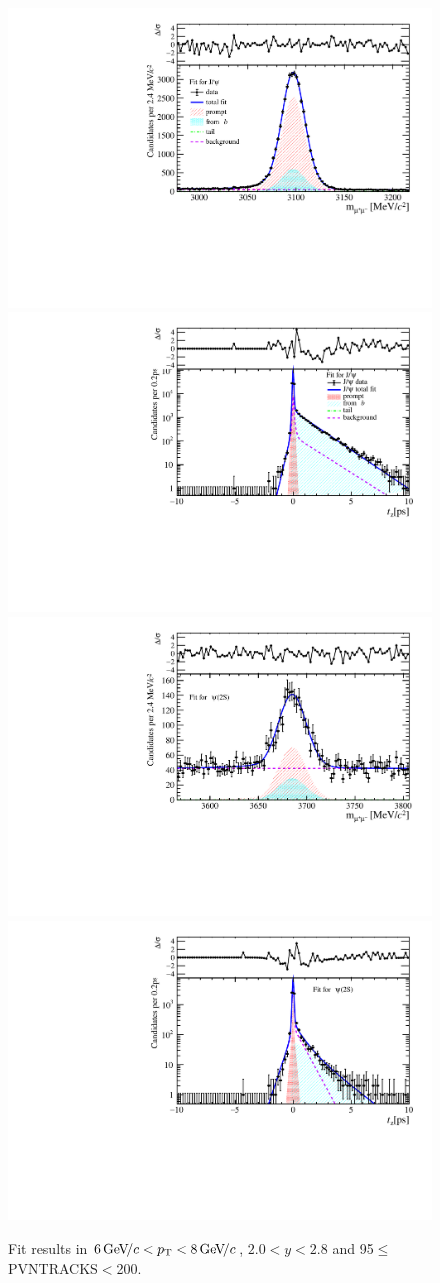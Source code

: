 \begin{figure}[H]
\begin{center}
\includegraphics[width=0.47\linewidth]{pdf/Jpsi/drawmass/n5y1pt4.pdf}
\includegraphics[width=0.47\linewidth]{pdf/Jpsi/2DFit/n5y1pt4.pdf}
\vspace*{-0.5cm}
\includegraphics[width=0.47\linewidth]{pdf/Psi2S/drawmass/n5y1pt4.pdf}
\includegraphics[width=0.47\linewidth]{pdf/Psi2S/2DFit/n5y1pt4.pdf}
\vspace*{-0.5cm}
\end{center}
\caption{Fit results in $6\text{\,Ge\kern -0.1em V\!/}c<p_{\mathrm{T}}<8\text{\,Ge\kern -0.1em V\!/}c$, $2.0<y<2.8$ and 95$\leq$PVNTRACKS$<$200.}
\label{Fitn5y1pt4}
\end{figure}
